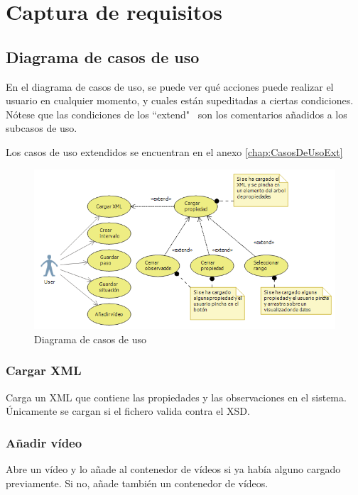 \chapter{Captura de requisitos}
%

\section{Diagrama de casos de uso}
En el diagrama de casos de uso, se puede ver qu\'e acciones puede realizar el 
usuario en cualquier momento, y cuales
est\'an supeditadas a ciertas condiciones. N\'otese que las condiciones de los ``extend" \ son los comentarios a\~nadidos
a los subcasos de uso.

Los casos de uso extendidos se encuentran en el anexo \ref{chap:CasosDeUsoExt}

\begin{figure}[h]
\centering
\includegraphics[width=1.0\linewidth]{./Figures/useCaseDiagram.png}
\caption[Diagrama de casos de uso]{Diagrama de casos de uso}
\label{fig:useCaseDiagram}
\end{figure}

\subsection{Cargar XML}
Carga un XML que contiene las propiedades y las observaciones en el sistema.
\'Unicamente se cargan si el fichero valida contra el XSD.

\subsection{A\~nadir v\'ideo}
Abre un v\'ideo y lo a\~nade al contenedor de v\'ideos si ya hab\'ia alguno 
cargado previamente. Si no, a\~nade tambi\'en un contenedor de v\'ideos.

